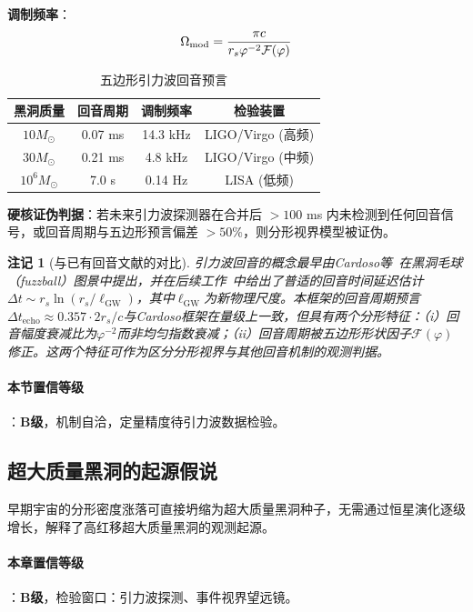 \documentclass[12pt,a4paper,twocolumn]{article}
\renewcommand{\phi}{\varphi}
\newtheorem{remark}[theorem]{注记}
\begin{document}
\textbf{调制频率}：
\begin{equation}
\Omega_{\rm mod} = \frac{\pi c}{r_s \phi^{-2}\mathcal{F}(\phi)}
\end{equation}

\begin{table}[H]
\centering
\footnotesize
\caption{五边形引力波回音预言}
\begin{tabular}{c|c|c|c}
\hline
\textbf{黑洞质量} & \textbf{回音周期} & \textbf{调制频率} & \textbf{检验装置} \\
\hline
$10 M_\odot$ & 0.07 ms & 14.3 kHz & LIGO/Virgo (高频) \\
$30 M_\odot$ & 0.21 ms & 4.8 kHz & LIGO/Virgo (中频) \\
$10^6 M_\odot$ & 7.0 s & 0.14 Hz & LISA (低频) \\
\hline
\end{tabular}
\end{table}

\textbf{硬核证伪判据}：若未来引力波探测器在合并后 $>100$ ms 内未检测到任何回音信号，或回音周期与五边形预言偏差 $>50\%$，则分形视界模型被证伪。

\begin{remark}[与已有回音文献的对比]
引力波回音的概念最早由Cardoso等~\cite{Cardoso2016}在黑洞毛球（fuzzball）图景中提出，并在后续工作~\cite{Cardoso2019}中给出了普适的回音时间延迟估计$\Delta t \sim r_s \ln(r_s/\ell_{\text{GW}})$，其中$\ell_{\text{GW}}$为新物理尺度。本框架的回音周期预言$\Delta t_{\text{echo}} \approx 0.357 \cdot 2r_s/c$与Cardoso框架在量级上一致，但具有两个分形特征：（i）回音幅度衰减比为$\phi^{-2}$而非均匀指数衰减；（ii）回音周期被五边形形状因子$\mathcal{F}(\phi)$修正。这两个特征可作为区分分形视界与其他回音机制的观测判据。
\end{remark}

\paragraph{本节置信等级}：\textbf{B级}，机制自洽，定量精度待引力波数据检验。

\subsection{超大质量黑洞的起源假说}
早期宇宙的分形密度涨落可直接坍缩为超大质量黑洞种子，无需通过恒星演化逐级增长，解释了高红移超大质量黑洞的观测起源。

\paragraph{本章置信等级}：\textbf{B级}，检验窗口：引力波探测、事件视界望远镜。
\end{document}
